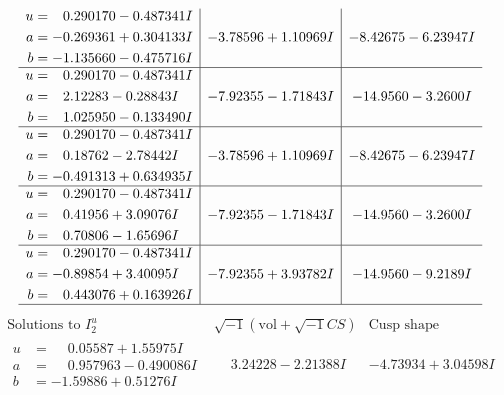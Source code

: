 \documentclass[1p]{elsarticle_modified}
\theoremstyle{definition}
\newcommand{\I}{\sqrt{-1}}
\begin{document}
$$\begin{array}{c|c|c}
\begin{aligned}
u &= \phantom{-}0.290170 - 0.487341 I \\
a &= -0.269361 + 0.304133 I \\
b &= -1.135660 - 0.475716 I\end{aligned}
 & -3.78596 + 1.10969 I & -8.42675 - 6.23947 I \\ \hline\begin{aligned}
u &= \phantom{-}0.290170 - 0.487341 I \\
a &= \phantom{-}2.12283 - 0.28843 I \\
b &= \phantom{-}1.025950 - 0.133490 I\end{aligned}
 & -7.92355 - 1.71843 I & -14.9560 - 3.2600 I \\ \hline\begin{aligned}
u &= \phantom{-}0.290170 - 0.487341 I \\
a &= \phantom{-}0.18762 - 2.78442 I \\
b &= -0.491313 + 0.634935 I\end{aligned}
 & -3.78596 + 1.10969 I & -8.42675 - 6.23947 I \\ \hline\begin{aligned}
u &= \phantom{-}0.290170 - 0.487341 I \\
a &= \phantom{-}0.41956 + 3.09076 I \\
b &= \phantom{-}0.70806 - 1.65696 I\end{aligned}
 & -7.92355 - 1.71843 I & -14.9560 - 3.2600 I \\ \hline\begin{aligned}
u &= \phantom{-}0.290170 - 0.487341 I \\
a &= -0.89854 + 3.40095 I \\
b &= \phantom{-}0.443076 + 0.163926 I\end{aligned}
 & -7.92355 + 3.93782 I & -14.9560 - 9.2189 I\\
 \hline 
 \end{array}$$\newpage$$\begin{array}{c|c|c}  
\text{Solutions to }I^u_{2}& \I (\text{vol} + \sqrt{-1}CS) & \text{Cusp shape}\\
 \hline 
\begin{aligned}
u &= \phantom{-}0.05587 + 1.55975 I \\
a &= \phantom{-}0.957963 - 0.490086 I \\
b &= -1.59886 + 0.51276 I\end{aligned}
 & \phantom{-}3.24228 - 2.21388 I & -4.73934 + 3.04598 I \\ \hline\begin{aligned}

\end{aligned}
\end{array}$$
\end{document}
